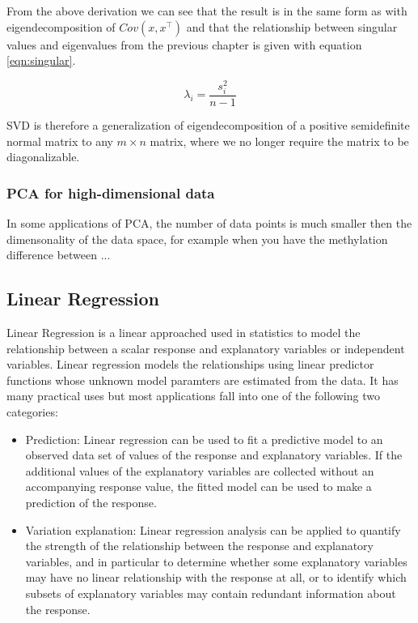 From the above derivation we can see that the result is in the same form as with eigendecomposition of $Cov(x, x^\intercal)$ and that the relationship between singular values  and eigenvalues from the previous chapter is given with equation \ref{eqn:singular}.

\begin{equation}
    \label{eqn:singular}
    \lambda_i = \frac{s_i^2}{n-1}
\end{equation}

SVD is therefore a generalization of eigendecomposition of a positive semidefinite normal matrix to any $m \times n$ matrix, where we no longer require the matrix to be diagonalizable.

\subsubsection{PCA for high-dimensional data} %
In some applications of PCA, the number of data points is much smaller then the dimensonality of the data space, for example when you have the methylation difference between ...

\subsection{Linear Regression}
Linear Regression is a linear approached used in statistics to model the relationship between a scalar response and explanatory variables or independent variables. Linear regression models the relationships using linear predictor functions whose unknown model paramters are estimated from the data. It has many practical uses but most applications fall into one of the following two categories:
\begin{itemize}
    \item Prediction: Linear regression can be used to fit a predictive model to an observed data set of values of the response and explanatory variables. If the additional values of the explanatory variables are collected without an accompanying response value, the fitted model can be used to make a prediction of the response.
    \item Variation explanation: Linear regression analysis can be applied to quantify the strength of the relationship between the response and explanatory variables, and in particular to determine whether some explanatory variables may have no linear relationship with the response at all, or to identify which subsets of explanatory variables may contain redundant information about the response.
\end{itemize}


